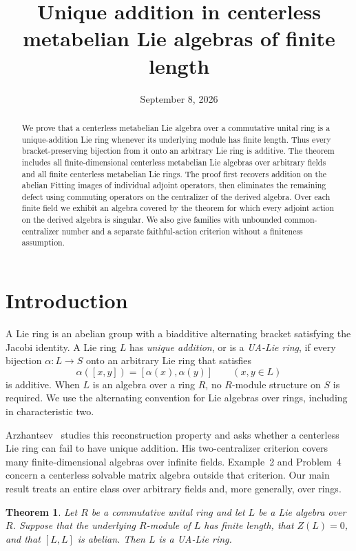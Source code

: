 \documentclass[11pt]{article}
\title{Unique addition in centerless metabelian Lie algebras of finite length}
\author{}
\date{September 8, 2026}
\newtheorem{theorem}{Theorem}
\theoremstyle{definition}
\begin{document}
\maketitle
\begin{abstract}
We prove that a centerless metabelian Lie algebra over a commutative unital ring is a unique-addition Lie ring whenever its underlying module has finite length. Thus every bracket-preserving bijection from it onto an arbitrary Lie ring is additive. The theorem includes all finite-dimensional centerless metabelian Lie algebras over arbitrary fields and all finite centerless metabelian Lie rings. The proof first recovers addition on the abelian Fitting images of individual adjoint operators, then eliminates the remaining defect using commuting operators on the centralizer of the derived algebra. Over each finite field we exhibit an algebra covered by the theorem for which every adjoint action on the derived algebra is singular. We also give families with unbounded common-centralizer number and a separate faithful-action criterion without a finiteness assumption.
\end{abstract}

\section{Introduction}
A Lie ring is an abelian group with a biadditive alternating bracket satisfying the Jacobi identity. A Lie ring $L$ has \emph{unique addition}, or is a \emph{UA-Lie ring}, if every bijection $\alpha:L\to S$ onto an arbitrary Lie ring that satisfies
\[
 \alpha([x,y])=[\alpha(x),\alpha(y)]\qquad(x,y\in L)
\]
is additive. When $L$ is an algebra over a ring $R$, no $R$-module structure on $S$ is required. We use the alternating convention for Lie algebras over rings, including in characteristic two.

Arzhantsev~\cite{Arz} studies this reconstruction property and asks whether a centerless Lie ring can fail to have unique addition. His two-centralizer criterion covers many finite-dimensional algebras over infinite fields. Example~2 and Problem~4 concern a centerless solvable matrix algebra outside that criterion. Our main result treats an entire class over arbitrary fields and, more generally, over rings.

\begin{theorem}\label{thm:main}
Let $R$ be a commutative unital ring and let $L$ be a Lie algebra over $R$. Suppose that the underlying $R$-module of $L$ has finite length, that $Z(L)=0$, and that $[L,L]$ is abelian. Then $L$ is a UA-Lie ring.
\end{theorem}
\end{document}
